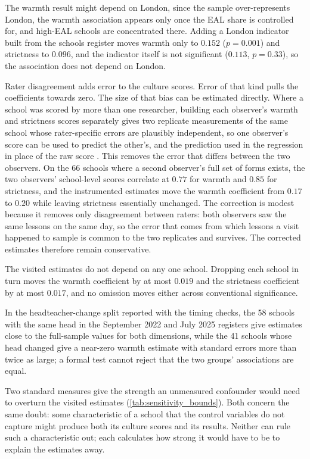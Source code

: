 The warmth result might depend on London, since
the sample over-represents London, the warmth association appears only once the EAL share is controlled for, and high-EAL schools are concentrated there. Adding a London indicator built from the schools register moves warmth only to $0.152$ ($p = 0.001$) and strictness to $0.096$, and the indicator itself is not significant ($0.113$, $p = 0.33$), so the association does not depend on London.

Rater disagreement adds error to the culture scores. Error of that kind pulls the coefficients towards zero. The size of that bias can be estimated directly. Where a school was
scored by more than one researcher, building each observer's warmth and
strictness scores separately gives two replicate measurements of the same
school whose rater-specific errors are plausibly independent, so one observer's score can be used to predict the other's, and the prediction used in the regression in place of the raw score \citep{gillen2019}. This removes the error that differs between the two observers. On the 66
schools where a second observer's full set of forms exists, the two
observers' school-level scores correlate at $0.77$ for warmth and $0.85$ for
strictness, and the instrumented estimates move the warmth coefficient from
$0.17$ to $0.20$ while leaving strictness essentially unchanged. The
correction is modest because it removes only disagreement between raters:
both observers saw the same lessons on the same day, so the error that comes
from which lessons a visit happened to sample is common to the two
replicates and survives. The corrected estimates therefore remain
conservative.

The visited estimates do not depend on any one school. Dropping each school in turn moves the warmth coefficient by at most $0.019$ and the strictness coefficient by at most $0.017$, and no omission moves either across conventional significance.

In the headteacher-change split reported with the timing checks, the 58 schools with the same head in the September 2022 and July 2025 registers give estimates close to the full-sample values for both dimensions, while the 41 schools whose head changed give a near-zero warmth estimate with standard errors more than twice as large; a formal test cannot reject that the two groups' associations are equal.

Two standard measures give the strength an unmeasured confounder would need to overturn the visited estimates (\cref{tab:sensitivity_bounds}). Both concern the same doubt: some characteristic of a school that the control variables do not capture might produce both its culture scores and its results. Neither can rule such a characteristic out; each calculates how strong it would have to be to explain the estimates away.

